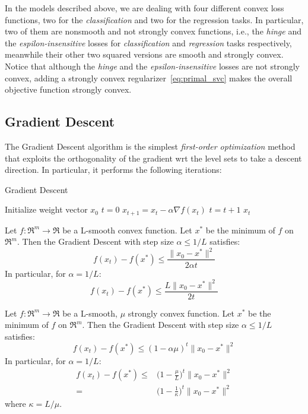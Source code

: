 In the models described above, we are dealing with four different convex loss functions, two for the \emph{classification} and two for the regression tasks. In particular, two of them are nonsmooth and not strongly convex functions, i.e., the \emph{hinge} and the \emph{espilon-insensitive} losses for \emph{classification} and \emph{regression} tasks respectively, meanwhile their other two squared versions are smooth and strongly convex. Notice that although the \emph{hinge} and the \emph{epsilon-insensitive} losses are not strongly convex, adding a strongly convex regularizer~\eqref{eq:primal_svc} makes the overall objective function strongly convex.

\pagebreak

\subsection{Gradient Descent}

The Gradient Descent algorithm is the simplest \emph{first-order optimization} method that exploits the orthogonality of the gradient wrt the level sets to take a descent direction. In particular, it performs the following iterations:

\begin{algorithm}[H]
	\caption{Gradient Descent}
	\label{alg:gd}
	\begin{algorithmic}
			\State Initialize weight vector $x_0$
			\State $t = 0$
				\State $x_{t+1} = x_t - \alpha \nabla f(x_t)$
				\State $t = t + 1$
			\EndWhile
			\State \Return $x_t$
		\EndFunction
	\end{algorithmic}
\end{algorithm}

\begin{theorem} \label{thm:cvx_gd_convergence}
Let $f: \Re^m \rightarrow \Re$ be a L-smooth convex function. Let $x^*$ be the minimum of $f$ on $\Re^m$. Then the Gradient Descent with step size $\alpha \leq 1/L$ satisfies:
$$
f(x_t) - f(x^*) \leq \frac{\| x_0 - x^* \|^2}{2 \alpha t}
$$
In particular, for $\alpha = 1/L$:
$$
f(x_t) - f(x^*) \leq \frac{L \| x_0 - x^* \|^2}{2 t}
$$
\end{theorem}

\begin{theorem} \label{thm:str_cvx_convergence}
Let $f: \Re^m \rightarrow \Re$ be a L-smooth, $\mu$ strongly convex function. Let $x^*$ be the minimum of $f$ on $\Re^m$. Then the Gradient Descent with step size $\alpha \leq 1/L$ satisfies:
$$
f(x_t) - f(x^*) \leq (1 - \alpha \mu)^t \| x_0 - x^* \|^2
$$
In particular, for $\alpha = 1/L$:
$$
\begin{aligned}
	f(x_t) - f(x^*) \leq & \bigg(1 - \frac{\mu}{L}\bigg)^t \| x_0 - x^* \|^2 \\
						= & \bigg(1 - \frac{1}{\kappa}\bigg)^t \| x_0 - x^* \|^2
\end{aligned}
$$
where $\kappa = L/\mu$.
\end{theorem}

